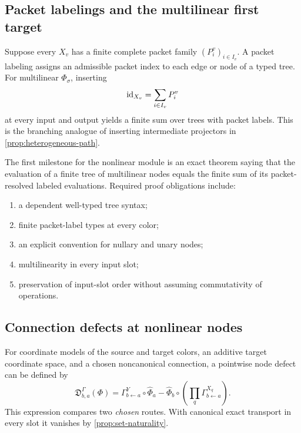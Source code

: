 \subsection{Packet labelings and the multilinear first target}

Suppose every $X_v$ has a finite complete packet family
$(P^v_i)_{i\in I_v}$.  A packet labeling assigns an admissible packet index
to each edge or node of a typed tree.  For multilinear $\Phi_\sigma$, inserting
\[
\mathrm{id}_{X_v}=\sum_{i\in I_v}P^v_i
\]
at every input and output yields a finite sum over trees with packet labels.
This is the branching analogue of inserting intermediate projectors in
\cref{prop:heterogeneous-path}.

\begin{roadmap}
\label{roadmap:multilinear-tree}
The first milestone for the nonlinear module is an exact theorem saying that the
evaluation of a finite tree of multilinear nodes equals the finite sum of its
packet-resolved labeled evaluations.  Required proof obligations include:
\begin{enumerate}[label=(\alph*)]
\item a dependent well-typed tree syntax;
\item finite packet-label types at every color;
\item an explicit convention for nullary and unary nodes;
\item multilinearity in every input slot;
\item preservation of input-slot order without assuming commutativity of
operations.
\end{enumerate}
\end{roadmap}

\subsection{Connection defects at nonlinear nodes}

For coordinate models of the source and target colors, an additive target
coordinate space, and a chosen noncanonical connection, a pointwise node
defect can be defined by
\[
\mathfrak D^\Gamma_{b,a}(\Phi)
=
\Gamma^Y_{b\leftarrow a}\circ\widehat\Phi_a
-
\widehat\Phi_b\circ
\left(\prod_q\Gamma^{X_q}_{b\leftarrow a}\right).
\]
This expression compares two \emph{chosen} routes.  With canonical exact
transport in every slot it vanishes by \cref{prop:set-naturality}.

